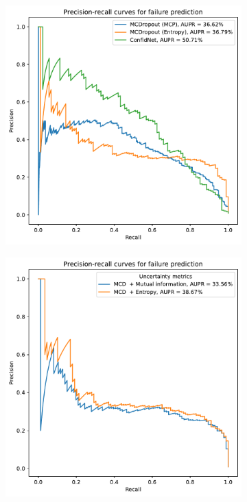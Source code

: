\begin{figure}[H]
    \centering
    \begin{subfigure}{0.45\textwidth}
        \includegraphics[width=\textwidth]{failure_aupr.pdf}
        \caption{}
        \label{fig:failure_aupr}
    \end{subfigure}%
    \begin{subfigure}{0.45\textwidth}
        \includegraphics[width=\textwidth]{failure_aupr_entropy_vs_mut_inf.pdf}

\end{subfigure}
\end{figure}
